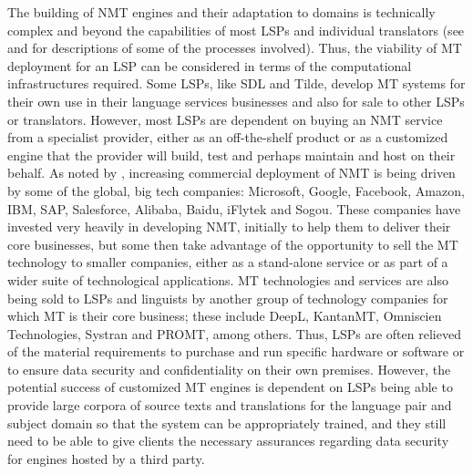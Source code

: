 \documentclass[output=paper,colorlinks,citecolor=brown]{langsci/langscibook}
\begin{document}
The building of NMT engines and their adaptation to domains is technically complex and beyond the capabilities of most LSPs and individual translators (see \citealt{gupta_improving_2019} and \citealt{silva_improving_2019} for descriptions of some of the processes involved). Thus, the viability of MT deployment for an LSP can be considered in terms of the computational infrastructures required. Some LSPs, like SDL and Tilde, develop MT systems for their own use in their language services businesses and also for sale to other LSPs or translators. However, most LSPs are dependent on buying an NMT service from a specialist provider, either as an off-the-shelf product or as a customized engine that the provider will build, test and perhaps maintain and host on their behalf. As noted by \citet[33]{faes_slator_2019}, increasing commercial deployment of NMT is being driven by some of the global, big tech companies: Microsoft, Google, Facebook, Amazon, IBM, SAP, Salesforce, Alibaba, Baidu, iFlytek and Sogou. These companies have invested very heavily in developing NMT, initially to help them to deliver their core businesses, but some then take advantage of the opportunity to sell the MT technology to smaller companies, either as a stand-alone service or as part of a wider suite of technological applications. MT technologies and services are also being sold to LSPs and linguists by another group of technology companies for which MT is their core business; these include DeepL, KantanMT, Omniscien Technologies, Systran and PROMT, among others. Thus, LSPs are often relieved of the material requirements to purchase and run specific hardware or software or to ensure data security and confidentiality on their own premises. However, the potential success of customized MT engines is dependent on LSPs being able to provide large corpora of source texts and translations for the language pair and subject domain so that the system can be appropriately trained, and they still need to be able to give clients the necessary assurances regarding data security for engines hosted by a third party.
\end{document}

